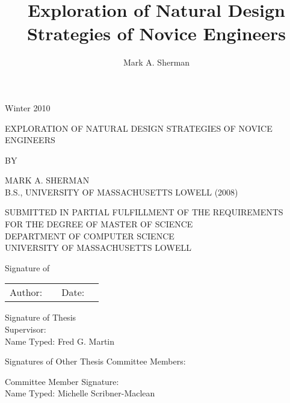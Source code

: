 
\title{Exploration of Natural Design Strategies of Novice Engineers}
\author{Mark A. Sherman}


\begin{titlepage}
\raggedright Winter 2010
\begin{center}

{\large \MakeUppercase{Exploration of Natural Design Strategies of Novice Engineers}}

BY

\MakeUppercase{Mark A. Sherman} \\
\MakeUppercase{B.S., University of Massachusetts Lowell (2008)}

\MakeUppercase{Submitted in partial fulfillment of the requirements} \\
\MakeUppercase{for the degree of master of science} \\
\MakeUppercase{Department of Computer Science} \\
\MakeUppercase{University of Massachusetts Lowell}

\end{center}

Signature of \\ 
\begin{tabular}{r p{7cm} c p{4cm} }
Author: &  & Date: &  \\ \cline{2-2} \cline{4-4}
\end{tabular}

Signature of Thesis \\ Supervisor: \underline{\hfill} \\
Name Typed: Fred G. Martin

Signatures of Other Thesis Committee Members:

Committee Member Signature: \\
Name Typed: Michelle Scribner-Maclean

\end{titlepage}

